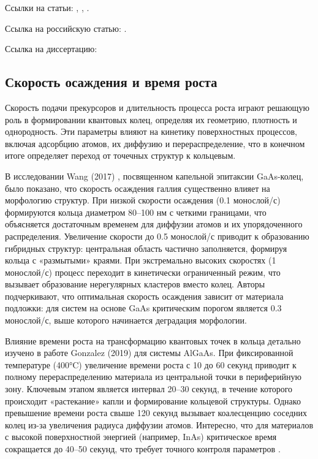 \documentclass[14pt,oneside]{extarticle}
\begin{document}
Ссылки на статьи: \cite{miller1}, \cite{miller2}, \cite{mohseni1}.

Ссылка на российскую статью: \cite{skubachevskii1}.

Ссылка на диссертацию:  \cite{pavlichenko1}

\subsection{Скорость осаждения и время роста}

Скорость подачи прекурсоров и длительность процесса роста играют решающую роль в формировании квантовых колец, определяя их геометрию, плотность и однородность. Эти параметры влияют на кинетику поверхностных процессов, включая адсорбцию атомов, их диффузию и перераспределение, что в конечном итоге определяет переход от точечных структур к кольцевым.

В исследовании Wang (2017) \cite{Wang1}, посвященном капельной эпитаксии GaAs-колец, было показано, что скорость осаждения галлия существенно влияет на морфологию структур. При низкой скорости осаждения (0.1 монослой/с) формируются кольца диаметром 80–100 нм с четкими границами, что объясняется достаточным временем для диффузии атомов и их упорядоченного распределения. Увеличение скорости до 0.5 монослой/с приводит к образованию гибридных структур: центральная область частично заполняется, формируя кольца с «размытыми» краями. При экстремально высоких скоростях (1 монослой/с) процесс переходит в кинетически ограниченный режим, что вызывает образование нерегулярных кластеров вместо колец. Авторы подчеркивают, что оптимальная скорость осаждения зависит от материала подложки: для систем на основе GaAs критическим порогом является 0.3 монослой/с, выше которого начинается деградация морфологии.

Влияние времени роста на трансформацию квантовых точек в кольца детально изучено в работе Gonzalez (2019) 
для системы AlGaAs. При фиксированной температуре (400°C) увеличение времени роста с 10 до 60 секунд приводит к полному перераспределению материала из центральной точки в периферийную зону. Ключевым этапом является интервал 20–30 секунд, в течение которого происходит «растекание» капли и формирование кольцевой структуры. Однако превышение времени роста свыше 120 секунд вызывает коалесценцию соседних колец из-за увеличения радиуса диффузии атомов. Интересно, что для материалов с высокой поверхностной энергией (например, InAs) критическое время сокращается до 40–50 секунд, что требует точного контроля параметров 
.
\end{document}
